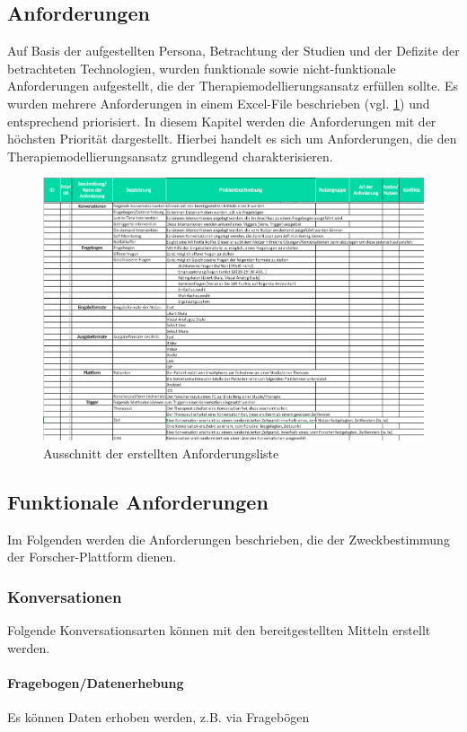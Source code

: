 \subsection{Anforderungen}
Auf Basis der aufgestellten Persona, Betrachtung der Studien und der Defizite der betrachteten Technologien, wurden funktionale sowie nicht-funktionale Anforderungen aufgestellt, die der Therapiemodellierungsansatz erfüllen sollte. Es wurden mehrere Anforderungen in einem Excel-File beschrieben (vgl. \ref{anforderungen}) und entsprechend priorisiert. In diesem Kapitel werden die Anforderungen mit der höchsten Priorität dargestellt. Hierbei handelt es sich um Anforderungen, die den Therapiemodellierungsansatz grundlegend charakterisieren.

\begin{figure}[h]
\centering
\includegraphics[width=1\textwidth]{pictures/anforderungen}
\caption{Ausschnitt der erstellten Anforderungsliste}
\label{anforderungen}
\end{figure}

\subsection{Funktionale Anforderungen}
Im Folgenden werden die Anforderungen beschrieben, die der Zweckbestimmung der Forscher-Plattform dienen.

\subsubsection{Konversationen}
Folgende Konversationsarten können mit den bereitgestellten Mitteln erstellt werden.

\paragraph{Fragebogen/Datenerhebung} Es können Daten erhoben werden, z.B. via Fragebögen

